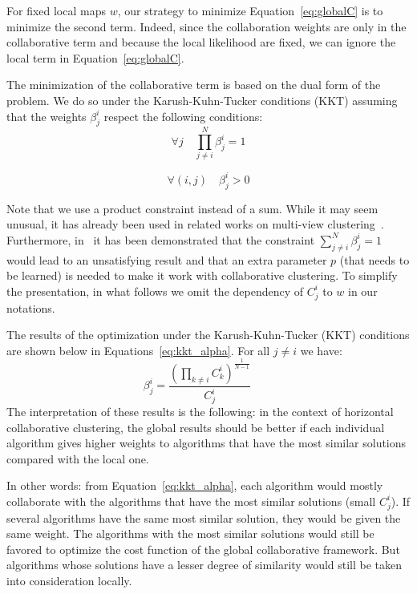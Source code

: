 For fixed local maps $w$, our strategy to minimize Equation~\eqref{eq:globalC} is to minimize the second term. Indeed, since the collaboration weights are only in the collaborative term and because the local likelihood are fixed, we can ignore the local term in Equation~\eqref{eq:globalC}.

The minimization of the collaborative term is based on the dual form of the problem. We do so under the Karush-Kuhn-Tucker conditions (KKT) 
\cite{KKT1} assuming that the weights $\beta_j^i$ respect the following conditions:
$$\forall j \quad \prod_{j \neq i}^N \beta_j^i = 1$$ 

$$\forall (i,j) \quad \beta_j^i >0 $$ 

Note that we use a product constraint instead of a sum. While it may seem unusual, it has already been used in related works on multi-view clustering~\cite{CarvalhoML15}. Furthermore, in~\cite{Sublime2017} it has been demonstrated that the constraint $\sum_{j \neq i}^N \beta_j^i = 1$ would lead to an unsatisfying result and that an extra parameter $p$ (that needs to be learned) is needed to make it work with collaborative clustering. To simplify the presentation, in what follows we omit the dependency of $C_j^i$ to $w$ in our notations.


The results of the optimization under the Karush-Kuhn-Tucker (KKT) conditions are shown below  in Equations~\eqref{eq:kkt_alpha}. For  all  $ j \neq i$  
we have:
\begin{equation}
\beta_j^i =  \frac{{(\prod_{k\neq i} C_k^i)}^{\frac 1 {N-1}}} {C_j^i} \qquad
\label{eq:kkt_alpha}
\end{equation} 
The interpretation of these results is the following: 
in the context of horizontal collaborative clustering, the global results should be better if each individual algorithm gives higher weights to algorithms that have the most similar solutions compared with the local one.

In other words: from Equation~\eqref{eq:kkt_alpha}, each algorithm would mostly collaborate with the algorithms that have the most similar solutions (small $C_j^i$). If several algorithms have the same most similar solution, they would be given the same weight.  The algorithms with the most similar solutions would still be favored to optimize the cost function of the global collaborative framework. But algorithms whose solutions have a lesser degree of similarity would still be taken into consideration locally. 

